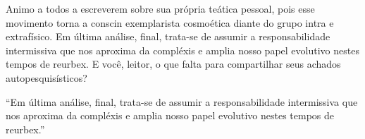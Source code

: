 \documentclass{gescons}
\begin{document}
\begin{multicols}{2}
Animo a todos a escreverem sobre sua própria teática pessoal, pois esse movimento torna a conscin exemplarista cosmoética diante do grupo intra e extrafísico. Em última análise, final, trata-se de assumir a responsabilidade intermissiva que nos aproxima da compléxis e amplia nosso papel evolutivo nestes tempos de reurbex. E você, leitor, o que falta para compartilhar seus achados autopesquisísticos?


\begin{pullquote}
    ``Em última análise, final, trata-se de assumir a responsabilidade intermissiva que nos aproxima da compléxis e amplia nosso papel evolutivo nestes tempos de reurbex.''
\end{pullquote}

    
    \end{multicols}
\end{document}
